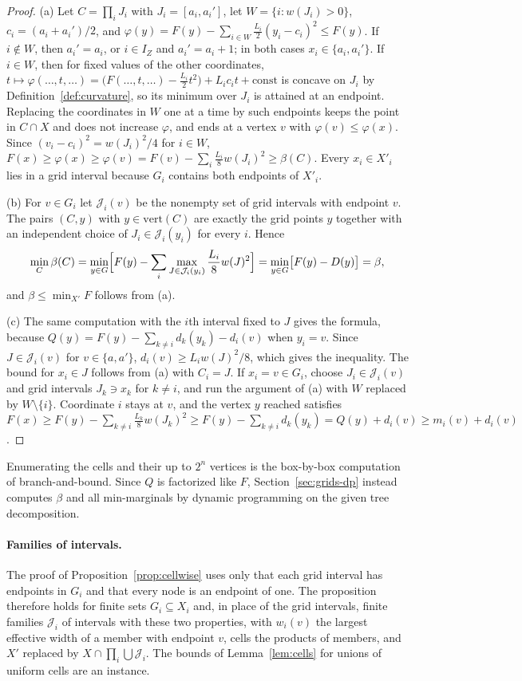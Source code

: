 \begin{proof}
(a) Let $C=\prod_iJ_i$ with $J_i=[a_i,a_i']$, let $W=\{i:w(J_i)>0\}$,
$c_i=(a_i+a_i')/2$, and
$\varphi(y)=F(y)-\sum_{i\in W}\frac{L_i}{2}(y_i-c_i)^2\le F(y)$. If $i\notin W$,
then $a_i'=a_i$, or $i\in I_Z$ and $a_i'=a_i+1$; in both cases
$x_i\in\{a_i,a_i'\}$. If $i\in W$, then for fixed values of the other
coordinates,
$t\mapsto\varphi(\dots,t,\dots)=\bigl(F(\dots,t,\dots)-\frac{L_i}2t^2\bigr)
+L_ic_it+\mathrm{const}$ is concave on $J_i$ by
Definition~\ref{def:curvature}, so its minimum over $J_i$ is attained at an
endpoint. Replacing the coordinates in $W$ one at a time by such endpoints
keeps the point in $C\cap X$ and does not increase $\varphi$, and ends at a
vertex $v$ with $\varphi(v)\le\varphi(x)$. Since $(v_i-c_i)^2=w(J_i)^2/4$
for $i\in W$,
$F(x)\ge\varphi(x)\ge\varphi(v)=F(v)-\sum_i\frac{L_i}8w(J_i)^2\ge\beta(C)$.
Every $x_i\in X'_i$ lies in a grid interval because $G_i$ contains both
endpoints of $X'_i$.

(b) For $v\in G_i$ let $\mathcal J_i(v)$ be the nonempty set of grid intervals
with endpoint $v$. The pairs $(C,y)$ with $y\in\mathrm{vert}(C)$ are exactly
the grid points $y$ together with an independent choice of
$J_i\in\mathcal J_i(y_i)$ for every $i$. Hence
\[
\min_C\beta(C)=\min_{y\in G}\Bigl[F(y)-\sum_i\max_{J\in\mathcal J_i(y_i)}
\frac{L_i}8w(J)^2\Bigr]=\min_{y\in G}\bigl[F(y)-D(y)\bigr]=\beta ,
\]
and $\beta\le\min_{X'}F$ follows from (a).

(c) The same computation with the $i$th interval fixed to $J$ gives the
formula, because $Q(y)=F(y)-\sum_{k\ne i}d_k(y_k)-d_i(v)$ when $y_i=v$. Since
$J\in\mathcal J_i(v)$ for $v\in\{a,a'\}$, $d_i(v)\ge L_iw(J)^2/8$, which
gives the inequality. The bound for $x_i\in J$ follows from (a) with $C_i=J$.
If $x_i=v\in G_i$, choose $J_i\in\mathcal J_i(v)$ and grid intervals
$J_k\ni x_k$ for $k\ne i$, and run the argument of (a) with $W$ replaced by
$W\setminus\{i\}$. Coordinate $i$ stays at $v$, and the vertex $y$ reached
satisfies
$F(x)\ge F(y)-\sum_{k\ne i}\frac{L_k}8w(J_k)^2\ge F(y)-\sum_{k\ne i}d_k(y_k)
=Q(y)+d_i(v)\ge m_i(v)+d_i(v)$.
\end{proof}

Enumerating the cells and their up to $2^n$ vertices is the box-by-box
computation of branch-and-bound. Since $Q$ is factorized like $F$,
Section~\ref{sec:grids-dp} instead computes $\beta$ and all min-marginals by
dynamic programming on the given tree decomposition.

\paragraph{Families of intervals.}
The proof of Proposition~\ref{prop:cellwise} uses only that each grid
interval has endpoints in $G_i$ and that every node is an endpoint of one.
The proposition therefore holds for finite sets $G_i\subseteq X_i$ and, in
place of the grid intervals, finite families $\mathcal J_i$ of intervals with
these two properties, with $w_i(v)$ the largest effective width of a member
with endpoint $v$, cells the products of members, and $X'$ replaced by
$X\cap\prod_i\bigcup\mathcal J_i$. The bounds of Lemma~\ref{lem:cells} for
unions of uniform cells are an instance.


